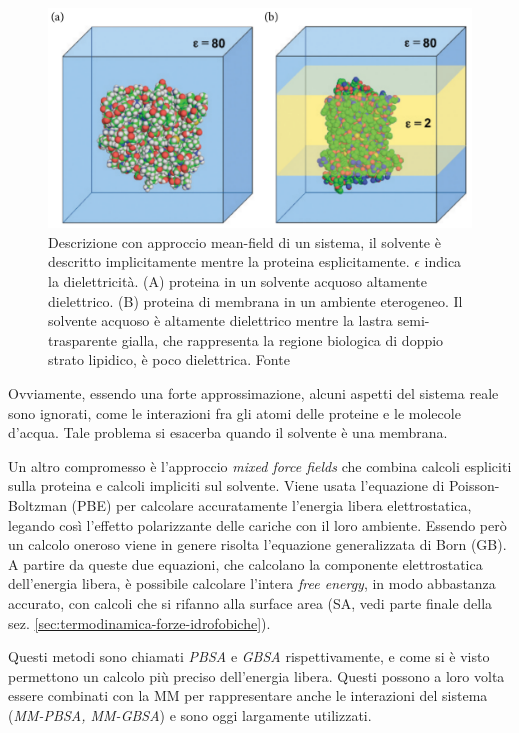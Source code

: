 {{\begin{figure}[!htb]
	\centering
	\includegraphics[scale=0.4]{images/mean-field.png}
	\caption{Descrizione con approccio mean-field di un sistema, il solvente è descritto implicitamente mentre la proteina esplicitamente. $\epsilon$ indica la dielettricità. (A) proteina in un solvente acquoso altamente dielettrico. (B) proteina di membrana in un ambiente eterogeneo. Il solvente acquoso è altamente dielettrico mentre la lastra semi-trasparente gialla, che rappresenta la regione biologica di doppio strato lipidico, è poco dielettrica. Fonte\cite{kessel_ben-tal_2018}}
	\label{fig:mean-field}
\end{figure}

Ovviamente, essendo una forte approssimazione, alcuni aspetti del sistema reale sono ignorati, come le interazioni fra gli atomi delle proteine e le molecole d'acqua. Tale problema si esacerba quando il solvente è una membrana. \\

\par Un altro compromesso è l'approccio \textit{mixed force fields} che combina calcoli espliciti sulla proteina e calcoli impliciti sul solvente. Viene usata l'equazione di Poisson-Boltzman (PBE) per calcolare accuratamente l'energia libera elettrostatica, legando così l'effetto polarizzante delle cariche con il loro ambiente. Essendo però un calcolo oneroso viene in genere risolta l'equazione generalizzata di Born (GB). A partire da queste due equazioni, che calcolano la componente elettrostatica dell'energia libera, è possibile calcolare l'intera \textit{free energy}, in modo abbastanza accurato, con calcoli che si rifanno alla surface area (SA, vedi parte finale della sez. \ref{sec:termodinamica-forze-idrofobiche}). 

\par Questi metodi sono chiamati \textit{PBSA} e \textit{GBSA} rispettivamente, e come si è visto permettono un calcolo più preciso dell'energia libera. Questi possono a loro volta essere combinati con la MM per rappresentare anche le interazioni del sistema (\textit{MM-PBSA, MM-GBSA}) e sono oggi largamente utilizzati.

}}
